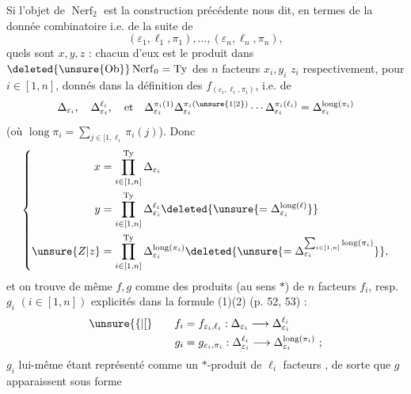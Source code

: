 

Si l'objet de $\operatorname{Nerf}_2$ est
la construction précédente nous dit, en termes de la donnée combinatoire i.e. de la suite de 
\[
(\varepsilon_1,\ell_1,\pi_1),\ldots,(\varepsilon_n,\ell_n,\pi_n),
\]
quels sont $x,y,z$ : chacun d'eux est le produit dans $\deleted{\unsure{\operatorname{Ob}}}\operatorname{Nerf}_0=\mathrm{Ty}$ des $n$ facteurs $x_i,y_i$ $z_i$ respectivement, pour $i\in[1,n]$, donnés dans la définition des $f_{(\varepsilon_i,\ell_i,\pi_i)}$, i.e. de
\[
\Delta_{\varepsilon_i},\quad\Delta_{\varepsilon_i}^{\ell_i},\quad\text{et}\quad
\Delta_{\varepsilon_i}^{\pi_i(1)}\Delta_{\varepsilon_i}^{\pi_i(\unsure{1|2})}\cdots
\Delta_{\varepsilon_i}^{\pi_i(\ell_i)}=\Delta_{\varepsilon_i}^{\operatorname{long}(\pi_i)}
\]
(où $\operatorname{long}\pi_i=\sum_{j\in[1,\ell_i}\pi_i(j)$). Donc
\[
\left\{\begin{aligned}
x&=\prod_{i\in[1,n]}^{\mathrm{Ty}}\Delta_{\varepsilon_i}\\
y&=\prod_{i\in[1,n]}^{\mathrm{Ty}}\Delta_{\varepsilon_i}^{\ell_i}
\deleted{\unsure{=\Delta_{\varepsilon_i}^{\operatorname{long}(\ell)}}}\\
\unsure{Z|z}&=\prod_{i\in[1,n]}^{\mathrm{Ty}}\Delta_{\varepsilon_i}^{\operatorname{long}(\pi_i)}
\deleted{\unsure{=\Delta_{\varepsilon_i}^{\sum_{i\in[1,n]}\operatorname{long}(\pi_i)}}},
\end{aligned}\right.
\]
et on trouve de même $f,g$ comme des produits (au sens $*$) de $n$ facteurs $f_i$, resp. $g_i$ $(i\in[1,n])$ explicités dans la formule (1)(2) (p. 52, 53) :
\[
\begin{aligned}
\unsure{\{|[} \qquad f_i&=f_{\varepsilon_i,\ell_i}:\Delta_{\varepsilon_i}\longrightarrow\Delta_{\varepsilon_i}^{\ell_i}\\
g_i&=g_{\varepsilon_i,\pi_i}:\Delta_{\varepsilon_i}^{\ell_i}\longrightarrow\Delta_{\varepsilon_i}^{\operatorname{long}(\pi_i)}\ ; 
\end{aligned}
\]
$g_i$ lui-même étant représenté comme un $*$-produit de $\ell_i$ facteurs , de sorte que  $g$ apparaissent sous forme
